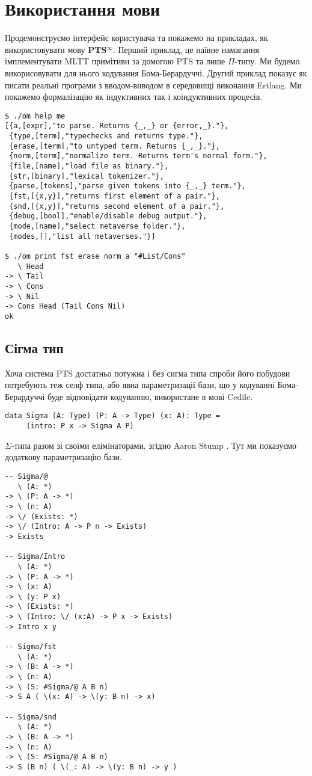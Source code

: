 \documentclass{article}
\begin{document}
\section{Використання мови}

Продемонструємо інтерфейс користувача та покажемо на прикладах, як використовувати мову \textbf{PTS$^\infty$}.
Перший приклад, це наївне намагання імплементувати MLTT примітиви за домогою PTS та лише $\Pi$-типу. Ми будемо
викорисовувати для нього кодування Бома-Берардуччі\cite{Bohm85}. Другий приклад показує як писати реальні програми
з вводом-виводом в середовищі виконання Ertlang. Ми покажемо формалізацію як індуктивних так і коіндуктивних процесів.

\begin{lstlisting}
$ ./om help me
[{a,[expr],"to parse. Returns {_,_} or {error,_}."},
 {type,[term],"typechecks and returns type."},
 {erase,[term],"to untyped term. Returns {_,_}."},
 {norm,[term],"normalize term. Returns term's normal form."},
 {file,[name],"load file as binary."},
 {str,[binary],"lexical tokenizer."},
 {parse,[tokens],"parse given tokens into {_,_} term."},
 {fst,[{x,y}],"returns first element of a pair."},
 {snd,[{x,y}],"returns second element of a pair."},
 {debug,[bool],"enable/disable debug output."},
 {mode,[name],"select metaverse folder."},
 {modes,[],"list all metaverses."}]

$ ./om print fst erase norm a "#List/Cons"
   \ Head
-> \ Tail
-> \ Cons
-> \ Nil
-> Cons Head (Tail Cons Nil)
ok
\end{lstlisting}

\subsection{Сігма тип}
Хоча система PTS достатньо потужна і без сигма типа спроби його побудови потребують теж селф типа, або явна параметризації бази,
що у кодуванні Бома-Берардуччі буде відповідати кодуванню, використане в мові Cedile.

\begin{lstlisting}
data Sigma (A: Type) (P: A -> Type) (x: A): Type =
     (intro: P x -> Sigma A P)
\end{lstlisting}

{\bf $\Sigma$}-типа разом зі своїми елімінаторами, згідно Aaron Stump \cite{Stump17}.
Тут ми показуємо додаткову параметризацію бази.

\begin{lstlisting}
-- Sigma/@
   \ (A: *)
-> \ (P: A -> *)
-> \ (n: A)
-> \/ (Exists: *)
-> \/ (Intro: A -> P n -> Exists)
-> Exists

-- Sigma/Intro
   \ (A: *)
-> \ (P: A -> *)
-> \ (x: A)
-> \ (y: P x)
-> \ (Exists: *)
-> \ (Intro: \/ (x:A) -> P x -> Exists)
-> Intro x y

-- Sigma/fst
   \ (A: *)
-> \ (B: A -> *)
-> \ (n: A)
-> \ (S: #Sigma/@ A B n)
-> S A ( \(x: A) -> \(y: B n) -> x)

-- Sigma/snd
   \ (A: *)
-> \ (B: A -> *)
-> \ (n: A)
-> \ (S: #Sigma/@ A B n)
-> S (B n) ( \(_: A) -> \(y: B n) -> y )
\end{lstlisting}
\end{document}
